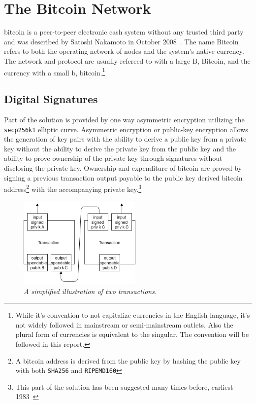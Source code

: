 \chapter{The Bitcoin Network}
	\label{sec:bitcoin}

\gls{bitcoin} is a peer-to-peer electronic cash system without any trusted third party and was described by Satoshi Nakamoto in October 2008~\cite{nakamoto:bitcoin}. The name Bitcoin refers to both the operating network of \gls{node}s and the system's native currency. The network and protocol are usually refereed to with a large B, Bitcoin, and the currency with a small b, bitcoin.\footnote{While it's convention to not capitalize currencies in the English language, it's not widely followed in mainstream or semi-mainstream outlets. Also the plural form of currencies is equivalent to the singular. The convention will be followed in this report.}

\section{Digital Signatures}

Part of the solution is provided by one way asymmetric encryption utilizing the \texttt{secp256k1} elliptic curve. Asymmetric encryption or public-key encryption allows the generation of key pairs with the ability to derive a public key from a private key without the ability to derive the private key from the public key and the ability to prove ownership of the private key through signatures without disclosing the private key. Ownership and expenditure of bitcoin are proved by signing a previous transaction output payable to the public key derived bitcoin address\footnote{A bitcoin address is derived from the public key by \gls{hash}ing the public key with both \texttt{SHA256} and \texttt{RIPEMD160}} with the accompanying private key.\footnote{This part of the solution has been suggested many times before, earliest 1983~\cite{chaum:blind:signatures}}

\begin{figure}[!htb]

	\centering
	\includegraphics[width=6cm]{images/transaction.png}
	\caption{\textit{A simplified illustration of two transactions. 
	}}
	\label{fig:two:tx}

\end{figure}

